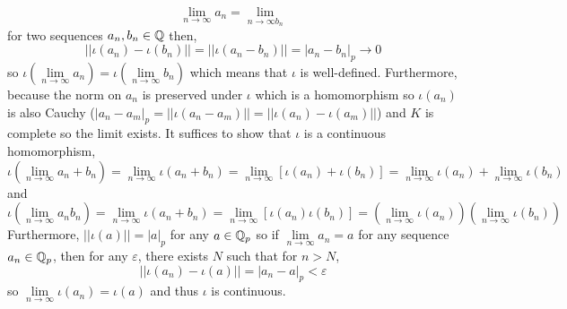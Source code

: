 \documentclass[12pt]{extarticle}
\begin{document}
\begin{enumerate}
\begin{enumerate}
\[ \lim\limits_{n \to \infty} a_n = \lim\limits_{n \to \infty b_n} \]
for two sequences $a_n, b_n \in \mathbb{Q}$ then,
\[ ||\iota(a_n) - \iota(b_n)|| = || \iota(a_n - b_n) || = |a_n - b_n|_p \to 0\]
so $\iota(\lim\limits_{n \to \infty} a_n) = \iota(\lim\limits_{n \to \infty} b_n)$ which means that $\iota$ is well-defined. 
Furthermore, because the norm on $a_n$ is preserved under $\iota$ which is a homomorphism so $\iota(a_n)$ is also Cauchy ($|a_n - a_m|_p = ||\iota(a_n - a_m)|| = ||\iota(a_n) - \iota(a_m)||$) and $K$ is complete so the limit exists. It suffices to show that $\iota$ is a continuous homomorphism,
\[\iota( \lim \limits_{n \to \infty} a_n + b_n) = \lim\limits_{n \to \infty} \iota(a_n + b_n) = \lim\limits_{n \to \infty} \left[ \iota(a_n) + \iota(b_n) \right] = \lim\limits_{n \to \infty} \iota(a_n) + \lim\limits_{n \to \infty}  \iota(b_n) \]
and 
\[\iota( \lim \limits_{n \to \infty} a_n b_n) = \lim\limits_{n \to \infty} \iota(a_n + b_n) = \lim\limits_{n \to \infty} \left[ \iota(a_n) \iota(b_n) \right] = \left( \lim\limits_{n \to \infty} \iota(a_n) \right) \left( \lim\limits_{n \to \infty}  \iota(b_n) \right) \]
Furthermore, $||\iota(a)|| = |a|_p$ for any $a \in \mathbb{Q}_p$ so if $\lim\limits_{n \to \infty} a_n = a$ for any sequence $a_n \in \mathbb{Q}_p$, then for any $\varepsilon$, there exists $N$ such that for $n > N$,
\[ ||\iota(a_n) - \iota(a)|| = |a_n - a|_p  < \varepsilon\]
so $\lim\limits_{n \to \infty} \iota(a_n) = \iota(a)$ and thus $\iota$ is continuous.  
\end{enumerate}


\end{enumerate}
\end{document}
